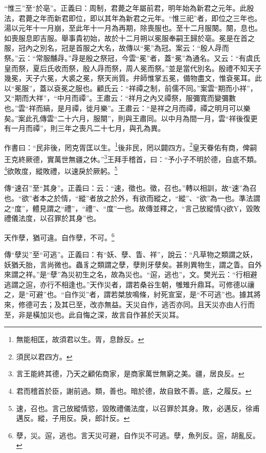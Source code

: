 {\noindent\shu{}\fzkt “惟三”至“於亳”。正義曰：周制，君薨之年屬前君，明年始為新君之元年。此殷法，君薨之年而新君即位，即以其年為新君之元年。“惟三祀”者，即位之三年也。湯以元年十一月崩，至此年十一月為再期，除喪服也。至十二月服闋。闋，息也。如喪服息即吉服。舉事貴初始，故於十二月朔以冕服奉嗣王歸於亳。冕是在首之服，冠內之別名，冠是首服之大名，故傳以“冕”為冠。案云：“殷人冔而祭。”云：“常服黼冔。”冔是殷之祭冠，今雲“冕”者，蓋“冕”為通名。又云：“有虞氏皇而祭，夏后氏收而祭，殷人冔而祭，周人冕而祭。”並是當代別名。殷禮不知天子幾冕，天子六冕，大裘之冕，祭天尚質。弁師惟掌五冕，備物盡文，惟袞冕耳。此以“冕服”，蓋以袞冕之服也。顧氏云：“祥禫之制，前儒不同。”案雲“期而小祥”，又“期而大祥”，“中月而禫”。王肅云：“祥月之內又禫祭，服彌寬而變彌數也。”雲“祥而縞，是月禫，徙月樂”。王肅云：“是祥之月而禫，禫之明月可以樂矣。”案此孔傳雲“二十六月，服闋”，則與王肅同。以中月為間一月，雲“祥後復更有一月而禫”，則三年之喪凡二十七月，與孔為異。 \par}

作書曰：“民非後，罔克胥匡以生。\footnote{無能相匡，故須君以生。胥，息餘反。}後非民，罔以闢四方。\footnote{須民以君四方。}皇天眷佑有商，俾嗣王克終厥德，實萬世無疆之休。”\footnote{言王能終其德，乃天之顧佑商家，是商家萬世無窮之美。疆，居良反。}王拜手稽首，曰：“予小子不明於德，自底不類。\footnote{君而稽首於臣，謝前過。類，善也。暗於德，故自致不善。底，之履反。}欲敗度，縱敗禮，以速戾於厥躬。\footnote{速，召也。言己放縱情慾，毀敗禮儀法度，以召罪於其身。敗，必邁反，徐甫邁反。縱，子用反。戾，郎計反。}

{\noindent\zhuan{}\fzbyks 傳“速召”至“其身”。正義曰：云：“速，徵也。徵，召也。”轉以相訓，故“速”為召也。“欲”者本之於情，“縱”者放之於外，有欲而縱之，“縱”、“欲”為一也。準法謂之“度”，體見謂之“禮”，“禮”、“度”一也。故傳並釋之，“言己放縱情Q欲Y，毀敗禮儀法度，以召罪於其身”也。 \par}

天作孽，猶可違。自作孽，不可。\footnote{孽，災。逭，逃也。言天災可避，自作災不可逃。孽，魚列反。逭，胡亂反。}

{\noindent\zhuan{}\fzbyks 傳“孽災”至“可逃”。正義曰：有“妖、孽、眚、祥”，說云：“凡草物之類謂之妖，妖猶夭胎，言尚微也。蟲豸之類謂之孽，孽則牙孽矣。甚則異物生，謂之眚。自外來謂之祥。”是“孽”為災初生之名，故為災也。“逭，逃也”，文。樊光云：“行相避逃謂之逭，亦行不相逢也。”天作災者，謂若桑谷生朝，雊雉升鼎耳。可修德以禳之，是“可避”也。“自作災”者，謂若桀放鳴條，紂死宣室，是“不可逃”也。據其將來，修德可去；及其已至，改亦無益。天災自作，逃否亦同。且天災亦由人行而至，非是橫加災也。此自悔之深，故言自作甚於天災耳。 \par}

